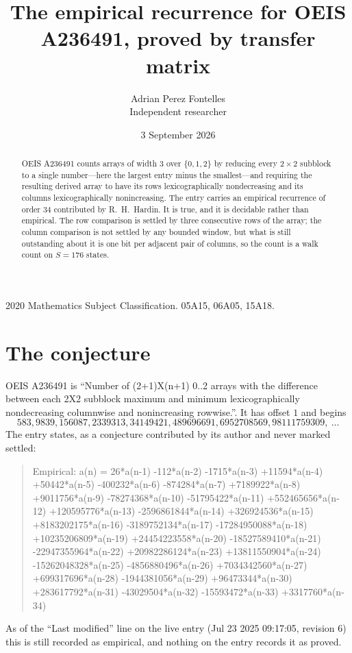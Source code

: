 \documentclass[11pt,a4paper]{article}
\title{The empirical recurrence for OEIS A236491, proved by transfer matrix}
\author{Adrian Perez Fontelles\\ \small Independent researcher}
\date{3 September 2026}
\theoremstyle{plain}
\theoremstyle{definition}
\begin{document}
\maketitle

\begin{abstract}
OEIS A236491 counts arrays of width $3$ over $\{0,1,2\}$ by reducing every $2\times2$ subblock to a
single number---here the largest entry minus the smallest---and requiring the resulting derived array to have its rows
lexicographically nondecreasing and its columns lexicographically nonincreasing. The entry carries an
empirical recurrence of order $34$ contributed by R.~H.~Hardin. It is true, and it is
decidable rather than empirical. The row comparison is settled by three consecutive rows of the
array; the column comparison is not settled by any bounded window, but what is still outstanding
about it is one bit per adjacent pair of columns, so the count is a walk count on $S=176$
states.
\end{abstract}

\noindent\small 2020 Mathematics Subject Classification. 05A15, 06A05, 15A18.\normalsize

\section{The conjecture}

OEIS A236491 is ``Number of (2+1)X(n+1) 0..2 arrays with the difference between each 2X2 subblock maximum and minimum lexicographically nondecreasing columnwise and nonincreasing rowwise.''. It has offset $1$ and begins
\[
583, 9839, 156087, 2339313, 34149421, 489696691, 6952708569, 98111759309,\ \dots
\]
The entry states, as a conjecture contributed by its author and never marked settled:
\begin{quote}
Empirical: a(n) = 26*a(n-1) -112*a(n-2) -1715*a(n-3) +11594*a(n-4) +50442*a(n-5) -400232*a(n-6) -874284*a(n-7) +7189922*a(n-8) +9011756*a(n-9) -78274368*a(n-10) -51795422*a(n-11) +552465656*a(n-12) +120595776*a(n-13) -2596861844*a(n-14) +326924536*a(n-15) +8183202175*a(n-16) -3189752134*a(n-17) -17284950088*a(n-18) +10235206809*a(n-19) +24454223558*a(n-20) -18527589410*a(n-21) -22947355964*a(n-22) +20982286124*a(n-23) +13811550904*a(n-24) -15262048328*a(n-25) -4856880496*a(n-26) +7034342560*a(n-27) +699317696*a(n-28) -1944381056*a(n-29) +96473344*a(n-30) +283617792*a(n-31) -43029504*a(n-32) -15593472*a(n-33) +3317760*a(n-34)
\end{quote}
As of the ``Last modified'' line on the live entry (Jul 23 2025 09:17:05, revision 6) this is still
recorded as empirical, and nothing on the entry records it as proved.
\end{document}
